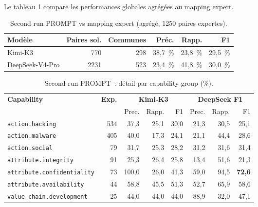 \documentclass[a4paper,12pt]{article}
\begin{document}
Le tableau \ref{tab:prompt-run2} compare les performances globales agrégées au mapping expert.

\begin{table}[H]
  \centering
  \begin{tabular}{l r r r r r}
    \toprule
    \textbf{Modèle} & \textbf{Paires sol.} & \textbf{Communes} &
    \textbf{Préc.} & \textbf{Rapp.} & \textbf{F1} \\
    \midrule
    Kimi-K3          &  770 & 298 & 38,7~\% & 23,8~\% & 29,5~\% \\
    DeepSeek-V4-Pro  & 2231 & 523 & 23,4~\% & 41,8~\% & 30,0~\% \\
    \bottomrule
  \end{tabular}
  \caption{Second run PROMPT vs mapping expert (agrégé, 1250 paires expertes).}
  \label{tab:prompt-run2}
\end{table}

\begin{table}[H]
  \centering
  \small
  \begin{tabular}{l r r r r r r r}
    \toprule
    \textbf{Capability} & \textbf{Exp.} &
    \multicolumn{3}{c}{\textbf{Kimi-K3}} &
    \multicolumn{3}{c}{\textbf{DeepSeek F1}} \\
    \cmidrule(lr){3-5} \cmidrule(lr){6-8}
	&  & Prec. & Rapp. & F1 & Prec. & Rapp. & F1 \\
    \midrule
    \texttt{action.hacking}            & 534 & 37,3 & 25,1 & 30,0 & 21,3 & 30,5 & 25,1 \\
    \texttt{action.malware}            & 405 & 40,0 & 17,3 & 24,1 & 21,1 & 44,4 & 28,6 \\
    \texttt{action.social}             &  79 & 31,7 & 25,3 & 28,2 & 31,2 & 31,6 & 31,4 \\
    \texttt{attribute.integrity}       &  91 & 25,3 & 26,4 & 25,8 & 13,4 & 51,6 & 21,3 \\
    \texttt{attribute.confidentiality} &  73 &100,0 & 26,0 & 41,3 & 59,0 & 94,5 & \textbf{72,6} \\
    \texttt{attribute.availability}    &  44 & 58,8 & 45,5 & 51,3 & 52,7 & 65,9 & 58,6 \\
    \texttt{value\_chain.development}  &  25 & 44,0 & 44,0 & 44,0 & 88,9 & 32,0 & 47,1 \\
    \bottomrule
  \end{tabular}
  \caption{Second run PROMPT~: détail par capability group (\%).}
  \label{tab:prompt-run2-detail}
\end{table}
\end{document}
